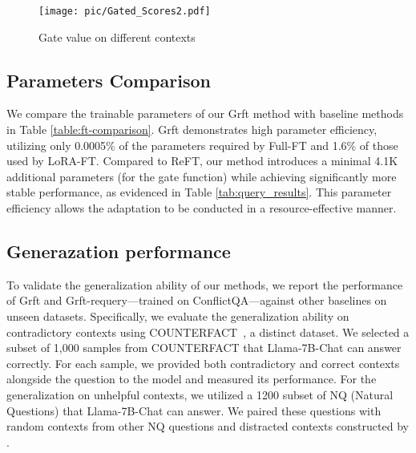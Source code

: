 \begin{figure}[htpb]
\centering
    \texttt{[image: pic/Gated\_Scores2.pdf]}
\caption{Gate value on different contexts}
\vspace{-0.2in}
\label{Fig:gate_value}
\end{figure}

\subsection{Parameters Comparison}
We compare the trainable parameters of our Grft method with baseline methods in Table \ref{table:ft-comparison}. Grft demonstrates high parameter efficiency, utilizing only 0.0005\% of the parameters required by Full-FT and 1.6\% of those used by LoRA-FT. Compared to ReFT, our method introduces a minimal 4.1K additional parameters (for the gate function) while achieving significantly more stable performance, as evidenced in Table \ref{tab:query_results}. This parameter efficiency allows the adaptation to be conducted in a resource-effective manner.


\subsection{Generazation performance}

To validate the generalization ability of our methods, we report the performance of Grft and Grft-requery—trained on ConflictQA—against other baselines on unseen datasets. Specifically, we evaluate the generalization ability on contradictory contexts using COUNTERFACT~\cite{meng2022locating}, a distinct dataset. We selected a subset of 1,000 samples from COUNTERFACT that Llama-7B-Chat can answer correctly. For each sample, we provided both contradictory and correct contexts alongside the question to the model and measured its performance.  For the generalization on unhelpful contexts, we utilized a 1200 subset of NQ (Natural Questions) that Llama-7B-Chat can answer. We paired these questions with random contexts from other NQ questions and distracted contexts constructed by \citet{Cuconasu_2024}. 

